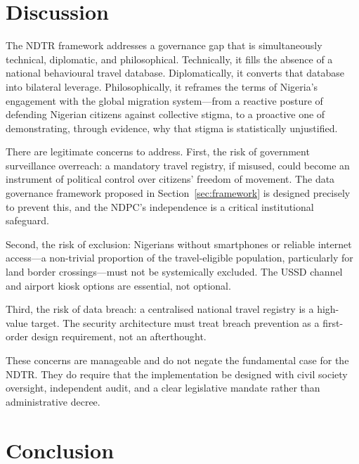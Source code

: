 \documentclass[11pt]{article}
\begin{document}
\section{Discussion}
\label{sec:discussion}

The NDTR framework addresses a governance gap that is simultaneously
technical, diplomatic, and philosophical. Technically, it fills the
absence of a national behavioural travel database.
Diplomatically, it converts that database into bilateral leverage.
Philosophically, it reframes the terms of Nigeria's engagement with
the global migration system---from a reactive posture of defending
Nigerian citizens against collective stigma, to a proactive one
of demonstrating, through evidence, why that stigma is statistically
unjustified.

There are legitimate concerns to address. First, the risk of
government surveillance overreach: a mandatory travel registry,
if misused, could become an instrument of political control over
citizens' freedom of movement. The data governance framework
proposed in Section~\ref{sec:framework} is designed precisely
to prevent this, and the NDPC's independence is a critical
institutional safeguard.

Second, the risk of exclusion: Nigerians without smartphones
or reliable internet access---a non-trivial proportion of
the travel-eligible population, particularly for land border
crossings---must not be systemically excluded.
The USSD channel and airport kiosk options are essential, not optional.

Third, the risk of data breach: a centralised national travel
registry is a high-value target. The security architecture
must treat breach prevention as a first-order design requirement,
not an afterthought.

These concerns are manageable and do not negate the fundamental
case for the NDTR. They do require that the implementation
be designed with civil society oversight, independent audit,
and a clear legislative mandate rather than administrative decree.

\section{Conclusion}
\label{sec:conclusion}
\end{document}
